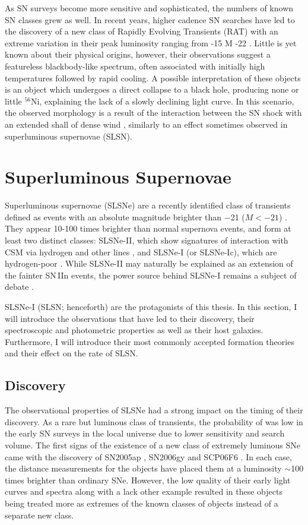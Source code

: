 As SN surveys become more sensitive and sophisticated, the numbers of known SN classes grew as well. In recent years, higher cadence SN searches have led to the discovery of a new class of Rapidly Evolving Transients (RAT) with an extreme variation in their peak luminosity ranging from -15 \corr{$<$} M \corr{$<$} -22 \citep{Pursiainen2018}. Little is yet known about their physical origins, however, their observations suggest a featureless blackbody-like spectrum, often associated with initially high temperatures followed by rapid cooling. A possible interpretation of these objects is an object which undergoes a direct collapse to a black hole, producing none or little $^{56}$Ni, explaining the lack of a slowly declining light curve. In this scenario, the observed morphology is a result of the interaction between the SN shock with an extended shall of dense wind \citep{Piro2015}, similarly to an effect sometimes observed in superluminous supernovae (SLSN).

\section{Superluminous Supernovae}
Superluminous supernovae (SLSNe) are a recently identified class of transients defined as events with an absolute magnitude brighter than $-$21 ($M<-21$) \citep{Gal-Yam2012}. They appear 10-100 times brighter than normal supernova events, and form at least two distinct classes: SLSNe-II, which show signatures of interaction with CSM via hydrogen and other lines \citep{Ofek2006,Smith2006,Drake2011}, and SLSNe-I (or SLSNe-Ic), which are hydrogen-poor \citep{Quimby2011}. While SLSNe-II may naturally be explained as an extension of the fainter SN\,IIn events, the power source behind SLSNe-I remains a subject of debate \citep{Gal-Yam2012}.

SLSNe-I (SLSN; henceforth) are the protagonists of this thesis. In this section, I will introduce the observations that have led to their discovery, their spectroscopic and photometric properties as well as their host galaxies. Furthermore, I will introduce their most commonly accepted formation theories and their effect on the rate of SLSN.

\subsection{Discovery}
The observational properties of SLSNe had a strong impact on the timing of their discovery. As a rare but luminous class of transients, the probability of  was low in the early SN surveys in the local universe due to  lower sensitivity and search volume. The first signs of the existence of a new class of extremely luminous SNe came with the discovery of SN2005ap \citep{Quimby2007}, SN2006gy \citep{Ofek2007} and SCP06F6 \citep{Barbary2009}. In each case, the distance measurements for the objects have placed them at a luminosity $\sim$100 times brighter than ordinary SNe. However, the low quality of their early light curves and spectra along with a lack  other example resulted in these objects being treated more as extremes of the known classes of objects instead of a separate new class.

